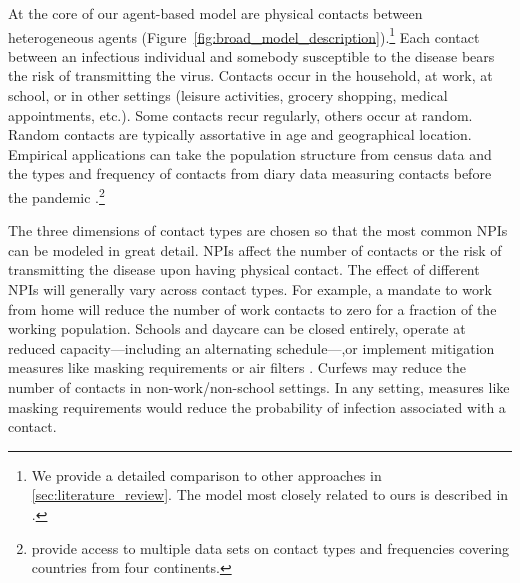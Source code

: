 At the core of our agent-based model are physical contacts between heterogeneous agents
(Figure~\ref{fig:broad_model_description}).\footnote{We provide a detailed comparison to
    other approaches in \ref{sec:literature_review}. The model most closely related to ours
    is described in \citet{Hinch2020}.} Each contact between an infectious individual and
somebody susceptible to the disease bears the risk of transmitting the virus. Contacts
occur in the household, at work, at school, or in other settings (leisure activities,
grocery shopping, medical appointments, etc.). Some contacts recur regularly, others
occur at random. Random contacts are typically assortative in age and geographical
location. Empirical applications can take the population structure from census data and
the types and frequency of contacts from diary data measuring contacts before the
pandemic \citep[e.g.][]{Mossong2008}.\footnote{\citet{Hoang2019} provide access to
    multiple data sets on contact types and frequencies covering countries from four
    continents.}

The three dimensions of contact types are chosen so that the most common NPIs can be
modeled in great detail. NPIs affect the number of contacts or the risk of transmitting
the disease upon having physical contact. The effect of different NPIs will generally
vary across contact types. For example, a mandate to work from home will reduce the
number of work contacts to zero for a fraction of the working population. Schools and
daycare can be closed entirely, operate at reduced capacity---including an alternating
schedule---,or implement mitigation measures like masking requirements or air filters
\citep{Lessler2021}. Curfews may reduce the number of contacts in non-work/non-school
settings. In any setting, measures like masking requirements would reduce the
probability of infection associated with a contact.

